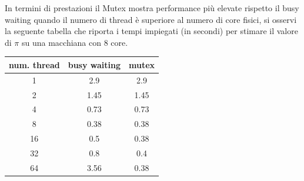 \documentclass[10pt, letterpaper]{report}
\begin{document}
In termini di prestazioni il Mutex mostra performance più elevate rispetto il busy 
waiting quando il numero di thread 
è superiore al numero di core fisici, si osservi la seguente tabella che riporta i tempi 
impiegati (in secondi) per stimare il valore di $\pi$ su una macchiana con 8 core.\begin{center}
    \begin{tabular}{c|c|c}
        \rowcolor[HTML]{FFFFC7} 
        num. thread & busy waiting & mutex \\ \hline
        \rowcolor[HTML]{ECF4FF} 
        1           & 2.9          & 2.9   \\
        \rowcolor[HTML]{EFEFEF} 
        2           & 1.45         & 1.45  \\
        \rowcolor[HTML]{ECF4FF} 
        4           & 0.73         & 0.73  \\
        \rowcolor[HTML]{EFEFEF} 
        8           & 0.38         & 0.38  \\
        \rowcolor[HTML]{ECF4FF} 
        16          & 0.5          & 0.38  \\
        \rowcolor[HTML]{EFEFEF} 
        32          & 0.8          & 0.4   \\
        \rowcolor[HTML]{ECF4FF} 
        64          & 3.56         & 0.38 
        \end{tabular}
\end{center}
\end{document}
